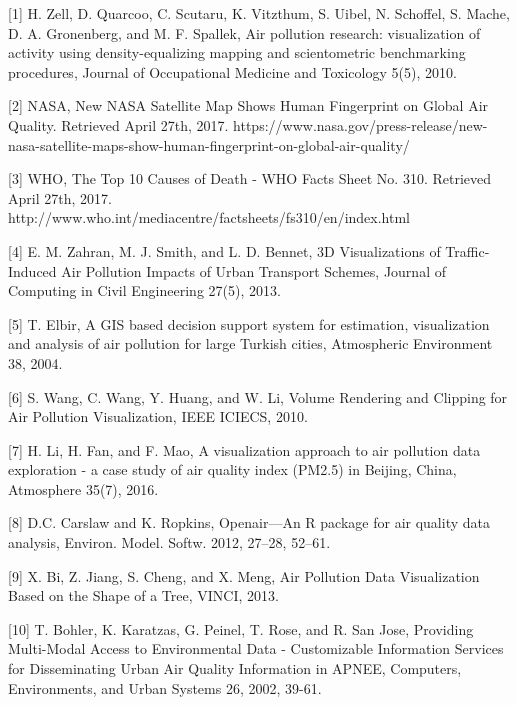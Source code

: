 \documentclass[journal]{vgtc}                %
\begin{document}
  [1] H. Zell, D. Quarcoo, C. Scutaru, K. Vitzthum, S. Uibel, N. Schoffel, S. Mache, D. A. Gronenberg, and M. F. Spallek, 
Air pollution research: visualization of activity using density-equalizing mapping and scientometric benchmarking procedures, Journal
of Occupational Medicine and Toxicology 5(5), 2010.

[2] NASA, New NASA Satellite Map Shows Human Fingerprint on Global Air Quality. Retrieved April 27th, 2017. 
https://www.nasa.gov/press-release/new-nasa-satellite-maps-show-human-fingerprint-on-global-air-quality/

[3] WHO, The Top 10 Causes of Death - WHO Facts Sheet No. 310. Retrieved April 27th, 2017.
http://www.who.int/mediacentre/factsheets/fs310/en/index.html

[4] E. M. Zahran, M. J. Smith, and L. D. Bennet, 3D Visualizations of Traffic-Induced Air Pollution Impacts of Urban Transport Schemes,
Journal of Computing in Civil Engineering 27(5), 2013.

[5] T. Elbir, A GIS based decision support system for estimation, visualization and analysis of air pollution for large Turkish cities,
Atmospheric Environment 38, 2004.

[6] S. Wang, C. Wang, Y. Huang, and W. Li, Volume Rendering and Clipping for Air Pollution Visualization, IEEE ICIECS, 2010.

[7] H. Li, H. Fan, and F. Mao, A visualization approach to air pollution data exploration - a case study of air quality index (PM2.5) in
Beijing, China, Atmosphere 35(7), 2016.

[8] D.C. Carslaw and K. Ropkins, Openair—An R package for air quality data analysis, Environ. Model. Softw. 2012, 27–28, 52–61.

[9] X. Bi, Z. Jiang, S. Cheng, and X. Meng, Air Pollution Data Visualization Based on the Shape of a Tree, VINCI, 2013.

[10] T. Bohler, K. Karatzas, G. Peinel, T. Rose, and R. San Jose, Providing Multi-Modal Access to Environmental Data - Customizable 
Information Services for Disseminating Urban Air Quality Information in APNEE, Computers, Environments, and Urban Systems 26, 2002, 39-61.
\end{document}
